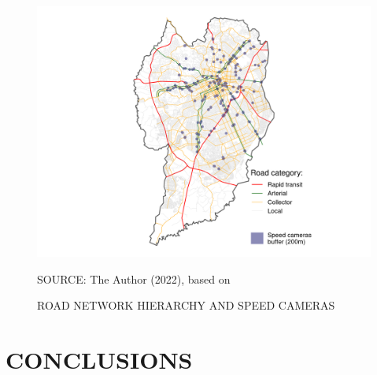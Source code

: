 \begin{figure}[!htbp]
    \footnotesize
    \captionsetup{font=footnotesize}
    \caption{ROAD NETWORK HIERARCHY AND SPEED CAMERAS}
    \centering
    \includegraphics{fig/cam_buffer_plot.png}
    \label{fig:cam_buffer}
    \par SOURCE: The Author (2022), based on \textcite{IPPUC2021, SETRAN2020}
\end{figure}




\chapter{CONCLUSIONS} \label{cap:conclusion}







